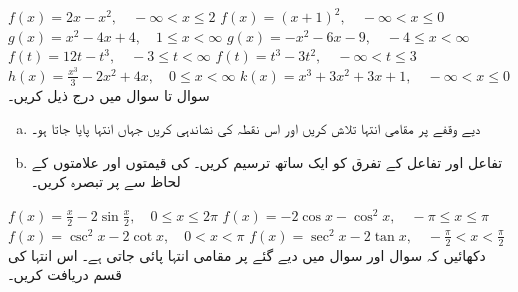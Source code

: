 $f(x)=2x-x^2,\quad -\infty<x\le 2$
$f(x)=(x+1)^2,\quad -\infty<x\le 0$
$g(x)=x^2-4x+4,\quad 1\le x<\infty$
$g(x)=-x^2-6x-9,\quad -4\le x<\infty$
$f(t)=12t-t^3,\quad -3\le t<\infty$
$f(t)=t^3-3t^2,\quad -\infty<t\le 3$
$h(x)=\tfrac{x^3}{3}-2x^2+4x,\quad 0\le x<\infty$
$k(x)=x^3+3x^2+3x+1,\quad -\infty<x\le 0$
\\
سوال  تا سوال  میں درج ذیل کریں۔
\begin{enumerate}[a.]
\item
دیے وقفے پر مقامی انتہا تلاش کریں اور  اس نقطہ کی نشاندہی کریں جہاں انتہا پایا جاتا ہو۔
\item
تفاعل اور تفاعل کے تفرق کو ایک ساتھ ترسیم کریں۔  کی قیمتوں اور علامتوں کے لحاظ سے  پر تبصرہ کریں۔
\end{enumerate}

$f(x)=\tfrac{x}{2}-2\sin\tfrac{x}{2},\quad 0\le x\le 2\pi$
$f(x)=-2\cos x-\cos^2x,\quad -\pi\le x\le \pi$
$f(x)=\csc^2x-2\cot x,\quad 0<x<\pi$
$f(x)=\sec^2x-2\tan x,\quad -\tfrac{\pi}{2}<x<\tfrac{\pi}{2}$
\\
دکھائیں کہ سوال  اور سوال  میں دیے گئے  پر مقامی انتہا پائی جاتی ہے۔ اس انتہا کی قسم دریافت کریں۔

